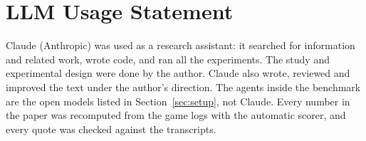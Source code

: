 \documentclass[11pt]{article}
\theoremstyle{compactdef}
\begin{document}
\newpage
\appendix
{}



\section*{LLM Usage Statement}

\noindent
Claude (Anthropic) was used as a research assistant: it searched for information and related work, wrote code, and ran all the experiments. The study and experimental design were done by the author. Claude also wrote, reviewed and improved the text under the author's direction. The agents inside the benchmark are the open models listed in Section~\ref{sec:setup}, not Claude. Every number in the paper was recomputed from the game logs with the automatic scorer, and every quote was checked against the transcripts.
\end{document}
